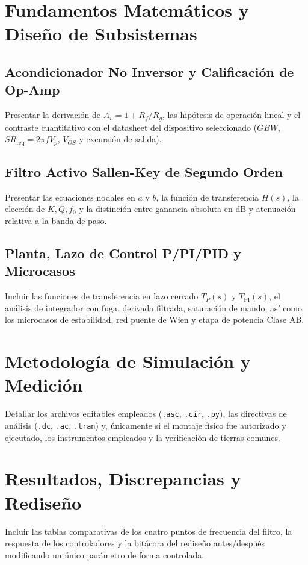 \documentclass[conference, a4paper]{IEEEtran}
\begin{document}
\section{Fundamentos Matemáticos y Diseño de Subsistemas}
\subsection{Acondicionador No Inversor y Calificación de Op-Amp}
Presentar la derivación de $A_v = 1 + R_f/R_g$, las hipótesis de operación lineal y el contraste cuantitativo con el datasheet del dispositivo seleccionado ($GBW$, $SR_{\text{req}} = 2\pi f V_p$, $V_{OS}$ y excursión de salida).

\subsection{Filtro Activo Sallen-Key de Segundo Orden}
Presentar las ecuaciones nodales en $a$ y $b$, la función de transferencia $H(s)$, la elección de $K, Q, f_0$ y la distinción entre ganancia absoluta en dB y atenuación relativa a la banda de paso.

\subsection{Planta, Lazo de Control P/PI/PID y Microcasos}
Incluir las funciones de transferencia en lazo cerrado $T_P(s)$ y $T_{\text{PI}}(s)$, el análisis de integrador con fuga, derivada filtrada, saturación de mando, así como los microcasos de estabilidad, red puente de Wien y etapa de potencia Clase AB.

\section{Metodología de Simulación y Medición}
Detallar los archivos editables empleados (\texttt{.asc}, \texttt{.cir}, \texttt{.py}), las directivas de análisis (\texttt{.dc}, \texttt{.ac}, \texttt{.tran}) y, únicamente si el montaje físico fue autorizado y ejecutado, los instrumentos empleados y la verificación de tierras comunes.

\section{Resultados, Discrepancias y Rediseño}
Incluir las tablas comparativas de los cuatro puntos de frecuencia del filtro, la respuesta de los controladores y la bitácora del rediseño antes/después modificando un único parámetro de forma controlada.
\end{document}
